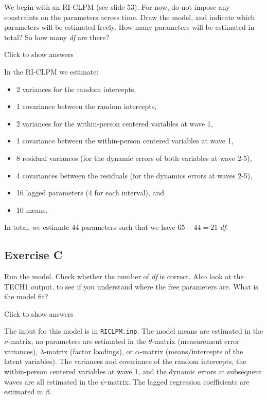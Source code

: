 \documentclass[
]{book}
\providecommand{\tightlist}{%
  \setlength{\itemsep}{0pt}\setlength{\parskip}{0pt}}
\begin{document}
We begin with an RI-CLPM (see slide 53). For now, do not impose any constraints on the parameters across time. Draw the model, and indicate which parameters will be estimated freely. How many parameters will be estimated in total? So how many \emph{df} are there?

Click to show answers

In the RI-CLPM we estimate:

\begin{itemize}
\tightlist
\item
  2 variances for the random intercepts,
\item
  1 covariance between the random intercepts,
\item
  2 variances for the within-person centered variables at wave 1,
\item
  1 covariance between the within-person centered variables at wave 1,
\item
  8 residual variances (for the dynamic errors of both variables at wave 2-5),
\item
  4 covariances between the residuals (for the dynamics errors at waves 2-5),
\item
  16 lagged parameters (4 for each interval), and
\item
  10 means.
\end{itemize}

In total, we estimate 44 parameters such that we have \(65 - 44 = 21\) \emph{df}.

\hypertarget{exercise-c-1}{%
\subsection{Exercise C}\label{exercise-c-1}}

Run the model. Check whether the number of \emph{df} is correct. Also look at the TECH1 output, to see if you understand where the free parameters are. What is the model fit?

Click to show answers

The input for this model is in \texttt{RICLPM.inp}. The model means are estimated in the \(\nu\)-matrix, no parameters are estimated in the \(\theta\)-matrix (measurement error variances), \(\lambda\)-matrix (factor loadings), or \(\alpha\)-matrix (means/intercepts of the latent variables). The variances and covariance of the random intercepts, the within-person centered variables at wave 1, and the dynamic errors at subsequent waves are all estimated in the \(\psi\)-matrix. The lagged regression coefficients are estimated in \(\beta\).
\end{document}
